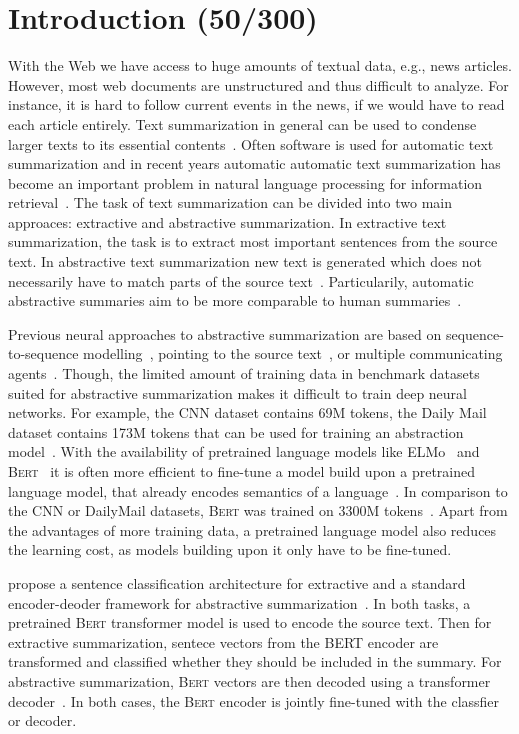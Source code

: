 \section{Introduction (50/300)}

With the Web we have access to huge amounts of textual data, e.g., news articles.
However, most web documents are unstructured and thus difficult to analyze.
For instance, it is hard to follow current events in the news, if we would have to read each article entirely.
Text summarization in general can be used to condense larger texts to its essential contents~\cite[xix]{Torres-Moreno2014}.
Often software is used for automatic text summarization and in recent years
automatic automatic text summarization has become an important problem in natural language processing for information retrieval~\cite[xxi\,f.]{Torres-Moreno2014}.
The task of text summarization can be divided into two main approaces: extractive and abstractive summarization. In extractive text summarization, the task is to extract most important sentences from the source text. In abstractive text summarization new text is generated which does not necessarily have to match parts of the source text~\cite[28]{Torres-Moreno2014}.
Particularily, automatic abstractive summaries aim to be more comparable to human summaries~\cite[220]{Torres-Moreno2014}.

Previous neural approaches to abstractive summarization are based on sequence-to-sequence modelling~\cite{NallapatiZSGX2016}, pointing to the source text~\cite{SeeLM2017}, or multiple communicating agents~\cite{CelikyilmazBHC2018}.
Though, the limited amount of training data in benchmark datasets suited for abstractive summarization makes it difficult to train deep neural networks.
For example, the CNN dataset contains 69M tokens, the Daily Mail dataset contains 173M tokens that can be used for training an abstraction model~\cite{HermannKGEKSB2015}. 
With the availability of pretrained language models like ELMo~\cite{PetersNIGCLZ2018} and \textsc{Bert}~\cite{DevlinCLT2019} it is often more efficient to fine-tune a model build upon a pretrained language model, that already encodes semantics of a language~\cite{LiuL2019}.
In comparison to the CNN or DailyMail datasets, \textsc{Bert} was trained on 3300M tokens~\cite{DevlinCLT2019}.
Apart from the advantages of more training data, a pretrained language model also reduces the learning cost, as models building upon it only have to be fine-tuned.

\citeauthor{LiuL2019} propose a sentence classification architecture for extractive and a standard encoder-deoder framework for abstractive summarization~\cite{LiuL2019}.
In both tasks, a pretrained \textsc{Bert} transformer model is used to encode the source text. Then for extractive summarization, sentece vectors from the BERT encoder are transformed and classified whether they should be included in the summary. For abstractive summarization, \textsc{Bert} vectors are then decoded using a transformer decoder~\cite{LiuL2019}. In both cases, the \textsc{Bert} encoder is jointly fine-tuned with the classfier or decoder.

